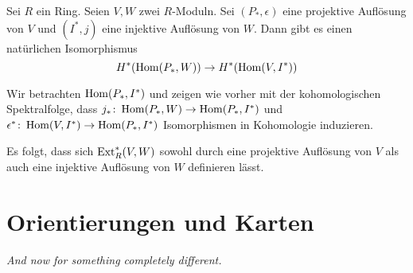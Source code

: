 \begin{satz}
	Sei $R$ ein Ring.
	Seien $V,W$ zwei $R$-Moduln.
	Sei $(P_*,\epsilon)$ eine projektive Auflösung von $V$ und $(I^*,j)$ eine injektive Auflösung von $W$.
	Dann gibt es einen natürlichen Isomorphismus 
	\[
		H^* \enbrace*{\Hom(P_*,W)} \to H^* \enbrace*{\Hom(V,I^*)}
	\]
\end{satz}
\begin{beweis}
	Wir betrachten $\operatorname{Hom}(P_*,I^*)$ und zeigen wie vorher mit der kohomologischen Spektralfolge, dass $j_* \colon \Hom \enbrace*{P_*,W} \to \Hom(P_*,I^*)$ und $\epsilon^* \colon \operatorname{Hom}(V,I^*) \to \operatorname{Hom}(P_*,I^*)$ Isomorphismen in Kohomologie induzieren.
\end{beweis}

\begin{bemerkung}
	Es folgt, dass sich $\operatorname{Ext}_R^*(V,W)$ sowohl durch eine projektive Auflösung von $V$ als auch eine injektive Auflösung von $W$ definieren lässt.
\end{bemerkung}
\newpage

\section{Orientierungen und Karten} %
\label{sec:19}

\emph{And now for something completely different.}

